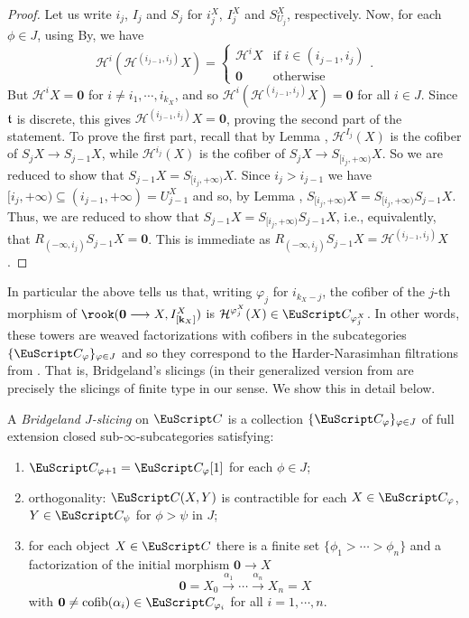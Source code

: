 \begin{proof}
Let us write $i_j$, $I_j$ and  $S_j$ for $i_j^X$, $I_j^X$ and  $S_{U_j}^X$, respectively.
Now, for each $\phi \in J$, using 
By, \aprop{} we have
\[
\mathcal{H}^{i}(\mathcal{H}^{(i_{j-1}, i_{j})}X)=
\begin{cases}
\mathcal{H}^{i}X &\text{if } i\in (i_{j-1},i_{j})\\
\mathbf{0} &\text{otherwise}
\end{cases}.
\]
 But $\mathcal{H}^iX=\mathbf{0}$ for $i \not = i_1 , \cdots , i_{k_X}$, and so $\mathcal{H}^{i}(\mathcal{H}^{(i_{j-1}, i_{j})}X)=\mathbf{0}$ for all $i \in J$. Since $\mathfrak{t}$ is discrete, this gives $\mathcal{H}^{(i_{j-1}, i_{j})}X= \mathbf{0}$, proving the second part of the statement. To prove the first part, recall that
by Lemma , $\mathcal{H}^{I_j}(X)$ is the cofiber of $S_{j}X\to S_{j-1}X$, while $\mathcal{H}^{i_j}(X)$ is the cofiber of $S_jX\to S_{[i_j,+\infty)}X$. So we are reduced to show that $S_{j-1}X=S_{[i_j,+\infty)}X$. Since $i_{j} > i_{j-1}$ we have $[i_{j},+\infty)\subseteq (i_{j-1},+\infty)=U_{j-1}^X$ and so, by Lemma , $S_{[i_j,+\infty)}X=S_{[i_j,+\infty)}S_{j-1}X$. Thus, we are reduced to show that $S_{j-1}X=S_{[i_j,+\infty)}S_{j-1}X$, i.e., equivalently, that $R_{(-\infty,i_j)}S_{j-1}X=\mathbf{0}$. This is immediate as $
R_{(-\infty,i_j)}S_{j-1}X=\mathcal{H}^{(i_{j-1}, i_j)}X$.
\end{proof}


In particular the above tells us that, writing $\varphi_j$ for $i_{k_X-j}$, the cofiber of the $j$-th morphism of $\rook(\mathbf{0} \to X,I_{[ \mathbf{k}_X ]}^X)$ is $\mathcal{H}^{\varphi_j^X}(X)\in \C_{\varphi_j^X}$. In other words, these towers are weaved factorizations with cofibers in the subcategories $\{ \C_{\varphi} \}_{\varphi \in J}$ and so they correspond to the Harder-Narasimhan filtrations from \cite{Brid}. That is,  Bridgeland's slicings (in their generalized version from \cite{GKR} are precisely the slicings of finite type in our sense. We show this in detail below.


\begin{definition}\label{def.bridgeland-slicing}
A \textit{Bridgeland $J$-slicing} on $\C$ is a collection $\{\C_{\phi} \}_{\phi \in J}$ of full extension closed sub-$\infty$-subcategories satisfying:  
 \begin{enumerate}[label=$\roman*$)]
\item $\C_{\phi +1}=\C_{\phi}[1]$ for each $\phi \in J$;
\item orthogonality: $\C(X,Y)$ is contractible for each $X \in \C_{\phi}$, $Y \in \C_{\psi}$ for $\phi > \psi$ in $J$;
\item for each object $X \in \C$ there is a finite set $\{ \phi_1 > \cdots > \phi_n \}$ and a factorization of the initial morphism $\mathbf{0} \to X$
$$ \mathbf{0}=X_0 \xrightarrow{\alpha_1} \cdots \xrightarrow{\alpha_n} X_n=X$$
with $\mathbf{0} \neq \cofib(\alpha_i) \in \C_{\phi_i}$ for all $i = 1, \cdots, n$. 
 \end{enumerate}
\end{definition} 


